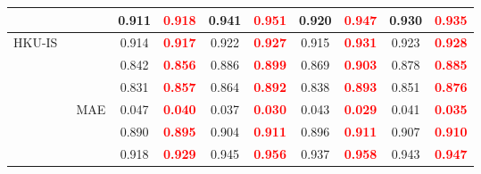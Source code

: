 \documentclass[runningheads]{llncs}
\begin{document}
\begin{table}[H]
{\begin{tabular}{l|l|cc|cc|cc|cc}
                                               &                                                      & 0.911                           & \textcolor{red}{\textbf{0.918}} & 0.941                           & \textcolor{red}{\textbf{0.951}} & 0.920 & \textcolor{red}{\textbf{0.947}} & 0.930                           & \textcolor{red}{\textbf{0.935}} \\ \hline
   \multirow{6}{*}{HKU-IS~\cite{HKU-IS}}       &                                                    & 0.914                           & \textcolor{red}{\textbf{0.917}} & 0.922                           & \textcolor{red}{\textbf{0.927}} & 0.915 & \textcolor{red}{\textbf{0.931}} & 0.923                           & \textcolor{red}{\textbf{0.928}} \\
                                               &                                                    & 0.842                           & \textcolor{red}{\textbf{0.856}} & 0.886                           & \textcolor{red}{\textbf{0.899}} & 0.869 & \textcolor{red}{\textbf{0.903}} & 0.878                           & \textcolor{red}{\textbf{0.885}} \\
                                               &                                         & 0.831                           & \textcolor{red}{\textbf{0.857}} & 0.864                           & \textcolor{red}{\textbf{0.892}} & 0.838 & \textcolor{red}{\textbf{0.893}} & 0.851                           & \textcolor{red}{\textbf{0.876}} \\
                                               & MAE                                                         & 0.047                           & \textcolor{red}{\textbf{0.040}} & 0.037                           & \textcolor{red}{\textbf{0.030}} & 0.043 & \textcolor{red}{\textbf{0.029}} & 0.041                           & \textcolor{red}{\textbf{0.035}} \\
                                               &                                                      & 0.890                           & \textcolor{red}{\textbf{0.895}} & 0.904                           & \textcolor{red}{\textbf{0.911}} & 0.896 & \textcolor{red}{\textbf{0.911}} & 0.907                           & \textcolor{red}{\textbf{0.910}} \\
                                               &                                                      & 0.918                           & \textcolor{red}{\textbf{0.929}} & 0.945                           & \textcolor{red}{\textbf{0.956}} & 0.937 & \textcolor{red}{\textbf{0.958}} & 0.943                           & \textcolor{red}{\textbf{0.947}} \\ \hline

\end{tabular}}
\end{table}
\end{document}

